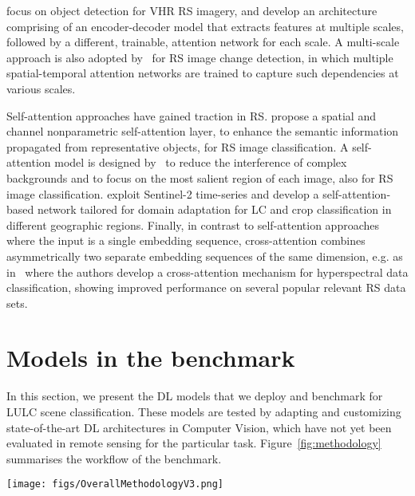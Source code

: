 \documentclass[journal]{IEEEtran}
\begin{document}
\cite{8513990} focus on object detection for VHR RS imagery, and develop an architecture comprising of an encoder-decoder model that extracts features at multiple scales, followed by a different, trainable, attention network for each scale. A multi-scale approach is also adopted by~\cite{rs12101662} for RS image change detection, in which multiple spatial-temporal attention networks are trained to capture such dependencies at various scales. 

Self-attention approaches have gained traction in RS. \cite{cao2020self} propose a spatial and channel nonparametric self-attention layer, to enhance the semantic information propagated from representative objects, for RS image classification. A self-attention model is designed by~\cite{wu2020self} to reduce the interference of complex backgrounds and to focus on the most salient region of each image, also for RS image classification. \cite{martini2021domain} exploit Sentinel-2 time-series and develop a self-attention-based network tailored for domain adaptation for LC and crop classification in different geographic regions. Finally, in contrast to self-attention approaches where the input is a single embedding sequence, cross-attention combines asymmetrically two separate embedding sequences of the same dimension, e.g. as in~\cite{cai2020remote} where the authors develop a cross-attention mechanism for hyperspectral data classification, showing improved performance on several popular relevant RS data sets. 


\section{Models in the benchmark}
In this section, we present the DL models that we deploy and benchmark for LULC scene classification.
These models are tested by adapting and customizing state-of-the-art DL architectures in Computer Vision, which have not yet been evaluated in remote sensing for the particular task.  Figure~\ref{fig:methodology} summarises the workflow of the benchmark.

\begin{figure*}[ht]
 \texttt{[image: figs/OverallMethodologyV3.png]} 
\caption{ Workflow for the benchmark. There are five model families tested in the benchmark. For EfficientNets and Wide Residual Networks we test variations with different attention modules and the addition of a Ghost module. We select the best performing model from each of the two base architectures and scale them through compound scaling. EfficientNet and Wide Residual Network architectures are explained in Figure~\ref{fig:EfficientNetArch} and Figure~\ref{fig:WideResNetArch} respectively.}
\label{fig:methodology}
\end{figure*}
\end{document}
